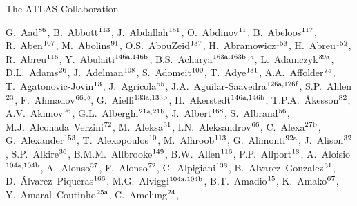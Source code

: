 \begin{flushleft}
{\Large The ATLAS Collaboration}

\bigskip

G.~Aad$^\textrm{\scriptsize 86}$,
B.~Abbott$^\textrm{\scriptsize 113}$,
J.~Abdallah$^\textrm{\scriptsize 151}$,
O.~Abdinov$^\textrm{\scriptsize 11}$,
B.~Abeloos$^\textrm{\scriptsize 117}$,
R.~Aben$^\textrm{\scriptsize 107}$,
M.~Abolins$^\textrm{\scriptsize 91}$,
O.S.~AbouZeid$^\textrm{\scriptsize 137}$,
H.~Abramowicz$^\textrm{\scriptsize 153}$,
H.~Abreu$^\textrm{\scriptsize 152}$,
R.~Abreu$^\textrm{\scriptsize 116}$,
Y.~Abulaiti$^\textrm{\scriptsize 146a,146b}$,
B.S.~Acharya$^\textrm{\scriptsize 163a,163b}$$^{,a}$,
L.~Adamczyk$^\textrm{\scriptsize 39a}$,
D.L.~Adams$^\textrm{\scriptsize 26}$,
J.~Adelman$^\textrm{\scriptsize 108}$,
S.~Adomeit$^\textrm{\scriptsize 100}$,
T.~Adye$^\textrm{\scriptsize 131}$,
A.A.~Affolder$^\textrm{\scriptsize 75}$,
T.~Agatonovic-Jovin$^\textrm{\scriptsize 13}$,
J.~Agricola$^\textrm{\scriptsize 55}$,
J.A.~Aguilar-Saavedra$^\textrm{\scriptsize 126a,126f}$,
S.P.~Ahlen$^\textrm{\scriptsize 23}$,
F.~Ahmadov$^\textrm{\scriptsize 66}$$^{,b}$,
G.~Aielli$^\textrm{\scriptsize 133a,133b}$,
H.~Akerstedt$^\textrm{\scriptsize 146a,146b}$,
T.P.A.~{\AA}kesson$^\textrm{\scriptsize 82}$,
A.V.~Akimov$^\textrm{\scriptsize 96}$,
G.L.~Alberghi$^\textrm{\scriptsize 21a,21b}$,
J.~Albert$^\textrm{\scriptsize 168}$,
S.~Albrand$^\textrm{\scriptsize 56}$,
M.J.~Alconada~Verzini$^\textrm{\scriptsize 72}$,
M.~Aleksa$^\textrm{\scriptsize 31}$,
I.N.~Aleksandrov$^\textrm{\scriptsize 66}$,
C.~Alexa$^\textrm{\scriptsize 27b}$,
G.~Alexander$^\textrm{\scriptsize 153}$,
T.~Alexopoulos$^\textrm{\scriptsize 10}$,
M.~Alhroob$^\textrm{\scriptsize 113}$,
G.~Alimonti$^\textrm{\scriptsize 92a}$,
J.~Alison$^\textrm{\scriptsize 32}$,
S.P.~Alkire$^\textrm{\scriptsize 36}$,
B.M.M.~Allbrooke$^\textrm{\scriptsize 149}$,
B.W.~Allen$^\textrm{\scriptsize 116}$,
P.P.~Allport$^\textrm{\scriptsize 18}$,
A.~Aloisio$^\textrm{\scriptsize 104a,104b}$,
A.~Alonso$^\textrm{\scriptsize 37}$,
F.~Alonso$^\textrm{\scriptsize 72}$,
C.~Alpigiani$^\textrm{\scriptsize 138}$,
B.~Alvarez~Gonzalez$^\textrm{\scriptsize 31}$,
D.~\'{A}lvarez~Piqueras$^\textrm{\scriptsize 166}$,
M.G.~Alviggi$^\textrm{\scriptsize 104a,104b}$,
B.T.~Amadio$^\textrm{\scriptsize 15}$,
K.~Amako$^\textrm{\scriptsize 67}$,
Y.~Amaral~Coutinho$^\textrm{\scriptsize 25a}$,
C.~Amelung$^\textrm{\scriptsize 24}$,

\end{flushleft}

